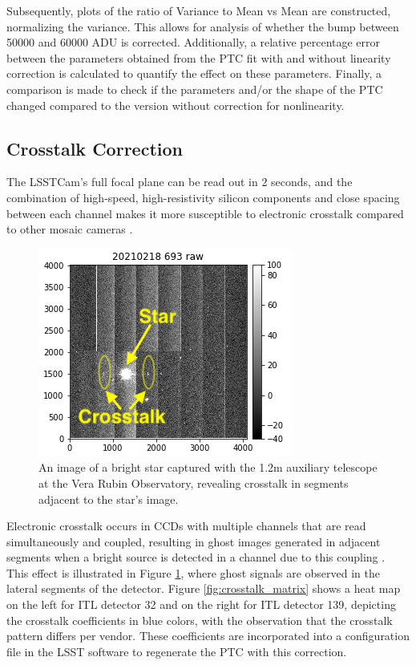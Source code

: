 Subsequently, plots of the ratio of Variance to Mean vs Mean are constructed, normalizing the variance. This allows for analysis of whether the bump between 50000 and 60000 ADU is corrected. Additionally, a relative percentage error between the parameters obtained from the PTC fit with and without linearity correction is calculated to quantify the effect on these parameters. Finally, a comparison is made to check if the parameters and/or the shape of the PTC changed compared to the version without correction for nonlinearity.


\subsection{Crosstalk Correction} \label{subsec:method_Crosstalk}

The LSSTCam's full focal plane can be read out in 2 seconds, and the combination of high-speed, high-resistivity silicon components and close spacing between each channel makes it more susceptible to electronic crosstalk compared to other mosaic cameras \citep{o2015crosstalk}.

\vspace{3mm}

\begin{figure}[!htb]
    \centering
    \includegraphics{Figures/Crosstalk_effect.png}
    \caption{An image of a bright star captured with the 1.2m auxiliary telescope at the Vera Rubin Observatory, revealing crosstalk in segments adjacent to the star's image.}
    \label{fig:crosstalk}
\end{figure}

Electronic crosstalk occurs in CCDs with multiple channels that are read simultaneously and coupled, resulting in ghost images generated in adjacent segments when a bright source is detected in a channel due to this coupling \citep{snyder2020laboratory}. This effect is illustrated in Figure \ref{fig:crosstalk}, where ghost signals are observed in the lateral segments of the detector. Figure \ref{fig:crosstalk_matrix} shows a heat map on the left for ITL detector 32 and on the right for ITL detector 139, depicting the crosstalk coefficients in blue colors, with the observation that the crosstalk pattern differs per vendor. These coefficients are incorporated into a configuration file in the LSST software to regenerate the PTC with this correction.

